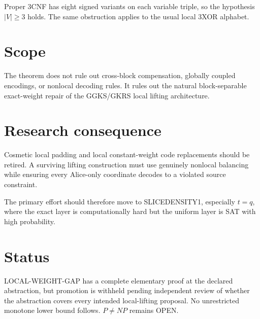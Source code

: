 \documentclass[11pt]{article}
\begin{document}
Proper 3CNF has eight signed variants on each variable triple, so the hypothesis \(|V|\ge3\) holds. The same obstruction applies to the usual local 3XOR alphabet.

\section{Scope}
The theorem does not rule out cross-block compensation, globally coupled encodings, or nonlocal decoding rules. It rules out the natural block-separable exact-weight repair of the GGKS/GKRS local lifting architecture.

\section{Research consequence}
Cosmetic local padding and local constant-weight code replacements should be retired. A surviving lifting construction must use genuinely nonlocal balancing while ensuring every Alice-only coordinate decodes to a violated source constraint.

The primary effort should therefore move to SLICEDENSITY1, especially \(t=q\), where the exact layer is computationally hard but the uniform layer is SAT with high probability.

\section{Status}
LOCAL-WEIGHT-GAP has a complete elementary proof at the declared abstraction, but promotion is withheld pending independent review of whether the abstraction covers every intended local-lifting proposal. No unrestricted monotone lower bound follows. \(P\ne NP\) remains OPEN.
\end{document}

